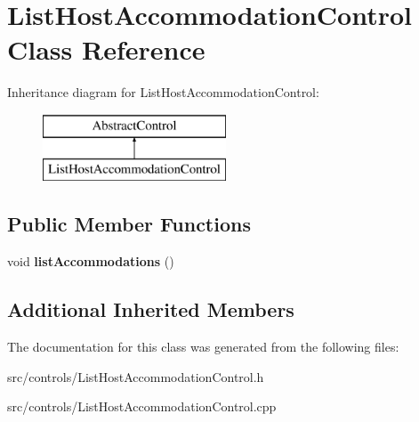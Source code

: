 \hypertarget{class_list_host_accommodation_control}{}\section{List\+Host\+Accommodation\+Control Class Reference}
\label{class_list_host_accommodation_control}
Inheritance diagram for List\+Host\+Accommodation\+Control\+:\begin{figure}[H]
\begin{center}
\leavevmode
\includegraphics[height=2.000000cm]{class_list_host_accommodation_control}
\end{center}
\end{figure}
\subsection*{Public Member Functions}
\begin{DoxyCompactItemize}
\item 
\mbox{\label{class_list_host_accommodation_control_a81b570b7ff3da104613be89c3899db39}} 
void {\bfseries list\+Accommodations} ()
\end{DoxyCompactItemize}
\subsection*{Additional Inherited Members}


The documentation for this class was generated from the following files\+:\begin{DoxyCompactItemize}
\item 
src/controls/List\+Host\+Accommodation\+Control.\+h\item 
src/controls/List\+Host\+Accommodation\+Control.\+cpp\end{DoxyCompactItemize}
